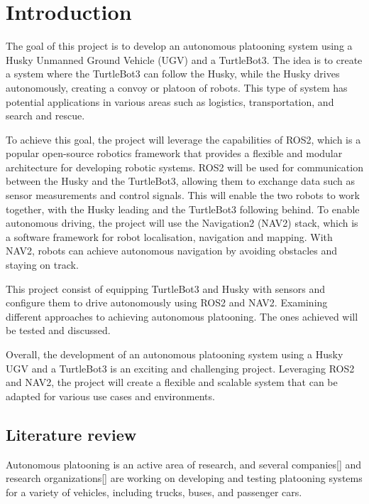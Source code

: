 \chapter{Introduction}

The goal of this project is to develop an autonomous platooning system using a Husky Unmanned Ground Vehicle (UGV) and a TurtleBot3. The idea is to create a system where the TurtleBot3 can follow the Husky, while the Husky drives autonomously, creating a convoy or platoon of robots. This type of system has potential applications in various areas such as logistics, transportation, and search and rescue.

To achieve this goal, the project will leverage the capabilities of ROS2, which is a popular open-source robotics framework that provides a flexible and modular architecture for developing robotic systems. ROS2 will be used for communication between the Husky and the TurtleBot3, allowing them to exchange data such as sensor measurements and control signals. This will enable the two robots to work together, with the Husky leading and the TurtleBot3 following behind.
To enable autonomous driving, the project will use the Navigation2 (NAV2) stack, which is a software framework for robot localisation, navigation and mapping. With NAV2, robots can achieve autonomous navigation by avoiding obstacles and staying on track.

This project consist of equipping TurtleBot3 and Husky with sensors and configure them to drive autonomously using ROS2 and NAV2. Examining different approaches to achieving autonomous platooning. The ones achieved will be tested and discussed.  

Overall, the development of an autonomous platooning system using a Husky UGV and a TurtleBot3 is an exciting and challenging project. Leveraging ROS2 and NAV2, the project will create a flexible and scalable system that can be adapted for various use cases and environments.

\section{Literature review}
Autonomous platooning is an active area of research, and several companies[] and research organizations[] are working on developing and testing platooning systems for a variety of vehicles, including trucks, buses, and passenger cars.
